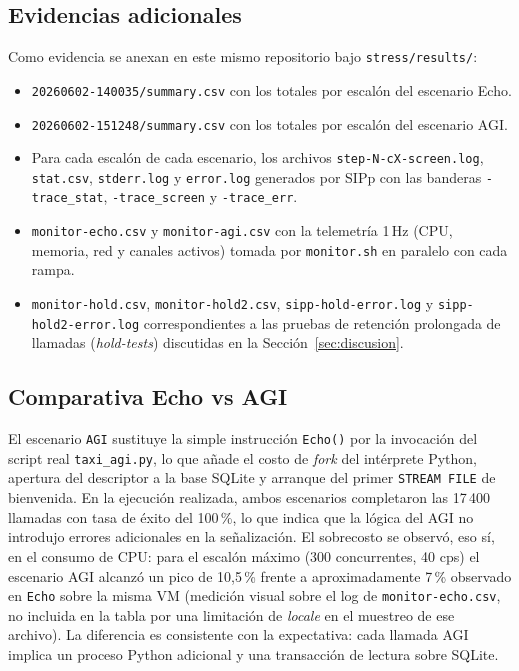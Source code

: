 \documentclass[conference]{IEEEtran}
\begin{document}
\subsection{Evidencias adicionales}

Como evidencia se anexan en este mismo repositorio bajo
\texttt{stress/results/}:
\begin{itemize}
    \item \texttt{20260602-140035/summary.csv} con los totales por
    escal\'on del escenario Echo.
    \item \texttt{20260602-151248/summary.csv} con los totales por
    escal\'on del escenario AGI.
    \item Para cada escal\'on de cada escenario, los archivos
    \texttt{step-N-cX-screen.log}, \texttt{stat.csv}, \texttt{stderr.log}
    y \texttt{error.log} generados por SIPp con las banderas
    \texttt{-trace\_stat}, \texttt{-trace\_screen} y \texttt{-trace\_err}.
    \item \texttt{monitor-echo.csv} y \texttt{monitor-agi.csv} con la
    telemetr\'ia 1\,Hz (CPU, memoria, red y canales activos) tomada por
    \texttt{monitor.sh} en paralelo con cada rampa.
    \item \texttt{monitor-hold.csv}, \texttt{monitor-hold2.csv},
    \texttt{sipp-hold-error.log} y \texttt{sipp-hold2-error.log}
    correspondientes a las pruebas de retenci\'on prolongada de
    llamadas (\textit{hold-tests}) discutidas en la Secci\'on~\ref{sec:discusion}.
\end{itemize}

\subsection{Comparativa Echo vs AGI}

El escenario \texttt{AGI} sustituye la simple instrucci\'on
\texttt{Echo()} por la invocaci\'on del script real
\texttt{taxi\_agi.py}, lo que a\~nade el costo de \textit{fork} del
int\'erprete Python, apertura del descriptor a la base SQLite y
arranque del primer \texttt{STREAM FILE} de bienvenida. En la
ejecuci\'on realizada, ambos escenarios completaron las 17\,400
llamadas con tasa de \'exito del 100\,\%, lo que indica que la l\'ogica
del AGI no introdujo errores adicionales en la se\~nalizaci\'on. El
sobrecosto se observ\'o, eso s\'i, en el consumo de CPU: para el
escal\'on m\'aximo (300 concurrentes, 40 cps) el escenario AGI alcanz\'o
un pico de 10{,}5\,\% frente a aproximadamente 7\,\% observado en
\texttt{Echo} sobre la misma VM (medici\'on visual sobre el log de
\texttt{monitor-echo.csv}, no incluida en la tabla por una limitaci\'on
de \textit{locale} en el muestreo de ese archivo). La diferencia es
consistente con la expectativa: cada llamada AGI implica un proceso
Python adicional y una transacci\'on de lectura sobre SQLite.
\end{document}
